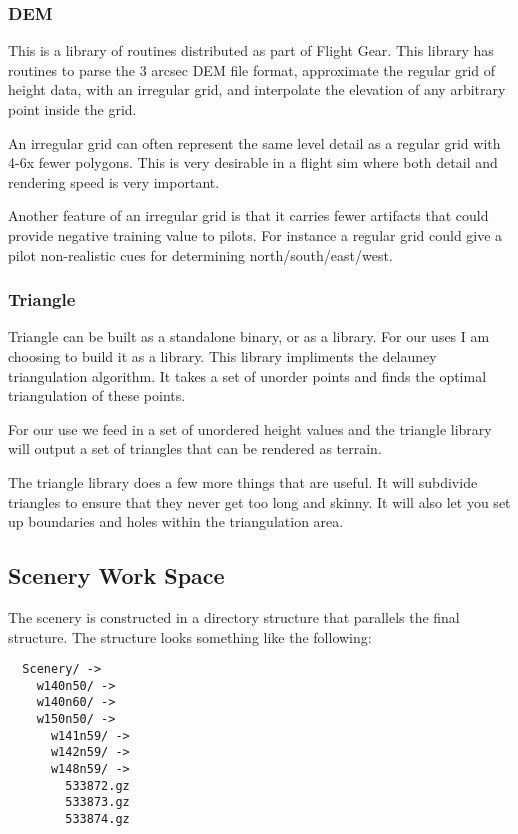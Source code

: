 \documentclass[12pt]{article}
\begin{document}
\subsubsection{DEM}

This is a library of routines distributed as part of Flight Gear.
This library has routines to parse the 3 arcsec DEM file format,
approximate the regular grid of height data, with an irregular grid,
and interpolate the elevation of any arbitrary point inside the grid.

An irregular grid can often represent the same level detail as a
regular grid with 4-6x fewer polygons.  This is very desirable in a
flight sim where both detail and rendering speed is very important.

Another feature of an irregular grid is that it carries fewer
artifacts that could provide negative training value to pilots.  For
instance a regular grid could give a pilot non-realistic cues for
determining north/south/east/west.


\subsubsection{Triangle}

Triangle can be built as a standalone binary, or as a library.  For
our uses I am choosing to build it as a library.  This library
impliments the delauney triangulation algorithm.  It takes a set of
unorder points and finds the optimal triangulation of these points.

For our use we feed in a set of unordered height values and the
triangle library will output a set of triangles that can be rendered
as terrain.

The triangle library does a few more things that are useful.  It will
subdivide triangles to ensure that they never get too long and
skinny.  It will also let you set up boundaries and holes within the
triangulation area.

\subsection{Scenery Work Space}

The scenery is constructed in a directory structure that parallels the
final structure.  The structure looks something like the following:

\begin{verbatim}
  Scenery/ ->
    w140n50/ ->
    w140n60/ ->
    w150n50/ ->
      w141n59/ ->
      w142n59/ ->
      w148n59/ ->
        533872.gz
        533873.gz
        533874.gz
\end{verbatim}
\end{document}
